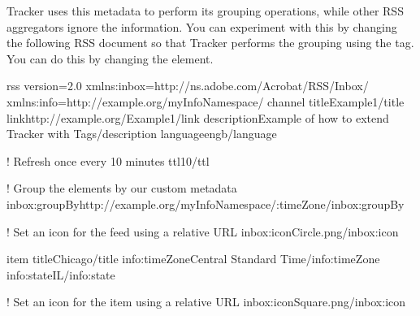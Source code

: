 \documentclass[letterpaper,12pt,english,openany,oneside]{sphinxmanual}
\begin{document}
\begin{sphinxVerbatim}[commandchars=\\\{\}]
  
\end{sphinxVerbatim}

Tracker uses this metadata to perform its grouping operations, while other RSS aggregators ignore the information. You can experiment with this by changing the following RSS document so that Tracker performs the grouping using the  tag. You can do this by changing the  element.

\begin{sphinxVerbatim}[commandchars=\\\{\}]
\PYGZlt{}rss version=\PYGZdq{}2.0\PYGZdq{} xmlns:inbox=\PYGZdq{}http://ns.adobe.com/Acrobat/RSS/Inbox/\PYGZdq{}
xmlns:info=\PYGZdq{}http://example.org/myInfoNamespace/\PYGZdq{}\PYGZgt{}
   \PYGZlt{}channel\PYGZgt{}
       \PYGZlt{}title\PYGZgt{}Example1\PYGZlt{}/title\PYGZgt{}
       \PYGZlt{}link\PYGZgt{}http://example.org/Example1\PYGZlt{}/link\PYGZgt{}
       \PYGZlt{}description\PYGZgt{}Example of how to extend Tracker with
           Tags\PYGZlt{}/description\PYGZgt{}
       \PYGZlt{}language\PYGZgt{}en\PYGZhy{}gb\PYGZlt{}/language\PYGZgt{}

       \PYGZlt{}!\PYGZhy{}\PYGZhy{} Refresh once every 10 minutes \PYGZhy{}\PYGZhy{}\PYGZgt{}
       \PYGZlt{}ttl\PYGZgt{}10\PYGZlt{}/ttl\PYGZgt{}

       \PYGZlt{}!\PYGZhy{}\PYGZhy{} Group the elements by our custom metadata \PYGZhy{}\PYGZhy{}\PYGZgt{}
       \PYGZlt{}inbox:groupBy\PYGZgt{}http://example.org/myInfoNamespace/:timeZone\PYGZlt{}/inbox:groupBy\PYGZgt{}

       \PYGZlt{}!\PYGZhy{}\PYGZhy{} Set an icon for the feed using a relative URL \PYGZhy{}\PYGZhy{}\PYGZgt{}
       \PYGZlt{}inbox:icon\PYGZgt{}Circle.png\PYGZlt{}/inbox:icon\PYGZgt{}

       \PYGZlt{}item\PYGZgt{}
           \PYGZlt{}title\PYGZgt{}Chicago\PYGZlt{}/title\PYGZgt{}
           \PYGZlt{}info:timeZone\PYGZgt{}Central Standard Time\PYGZlt{}/info:timeZone\PYGZgt{}
           \PYGZlt{}info:state\PYGZgt{}IL\PYGZlt{}/info:state\PYGZgt{}

           \PYGZlt{}!\PYGZhy{}\PYGZhy{} Set an icon for the item using a relative URL \PYGZhy{}\PYGZhy{}\PYGZgt{}
           \PYGZlt{}inbox:icon\PYGZgt{}Square.png\PYGZlt{}/inbox:icon\PYGZgt{}


\end{sphinxVerbatim}
\end{document}

